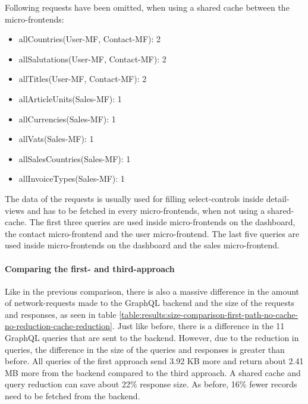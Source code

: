 Following requests have been omitted, when using a shared cache between the micro-frontends:

\begin{itemize}
    \item allCountries(User-MF, Contact-MF): 2
    \item allSalutations(User-MF, Contact-MF): 2
    \item allTitles(User-MF, Contact-MF): 2
    \item allArticleUnits(Sales-MF): 1
    \item allCurrencies(Sales-MF): 1
    \item allVats(Sales-MF): 1
    \item allSalesCountries(Sales-MF): 1
    \item allInvoiceTypes(Sales-MF): 1
\end{itemize}

The data of the requests is usually used for filling select-controls inside detail-views and has to be fetched in every micro-frontends, when not using a shared-cache. The first three queries are used inside micro-frontends on the dashboard, the contact micro-frontend and the user micro-frontend. The last five queries are used inside micro-frontends on the dashboard and the sales micro-frontend.

\paragraph{Comparing the first- and third-approach}

Like in the previous comparison, there is also a massive difference in the amount of network-requests made to the GraphQL backend and the size of the requests and responses, as seen in table \ref{table:results:size-comparison-first-path-no-cache-no-reduction-cache-reduction}. Just like before, there is a difference in the 11 GraphQL queries that are sent to the backend. However, due to the reduction in queries, the difference in the size of the queries and responses is greater than before. All queries of the first approach send 3.92 KB more and return about 2.41 MB more from the backend compared to the third approach. A shared cache and query reduction can save about 22\% response size. As before, 16\% fewer records need to be fetched from the backend.

